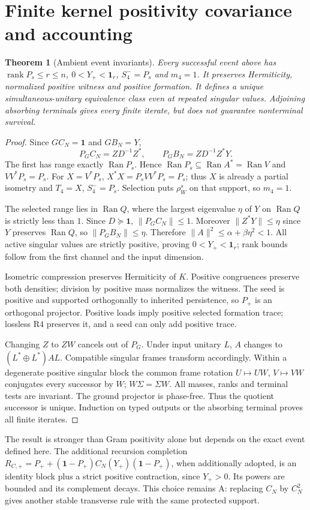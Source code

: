 \documentclass[11pt,letterpaper]{article}
\newcommand{\rank}{\operatorname{rank}}
\newcommand{\Ran}{\operatorname{Ran}}
\newcommand{\Id}{\mathbf 1}
\newtheorem{theorem}{Theorem}[section]
\theoremstyle{definition}
\numberwithin{equation}{section}
\begin{document}
\section{Finite kernel positivity covariance and accounting}
\begin{theorem}[Ambient event invariants]\label{ambient}
Every successful event above has $\rank P_s\leq r\leq n$, $0<Y_+<\Id_r$, $S_4^-=P_s$ and $m_4=1$. It preserves Hermiticity, normalized positive witness and positive formation. It defines a unique simultaneous-unitary equivalence class even at repeated singular values. Adjoining absorbing terminals gives every finite iterate, but does not guarantee nonterminal survival.
\end{theorem}
\begin{proof}
Since $GC_N=\Id$ and $GB_N=Y$,
\begin{equation}
P_GC_N=ZD^{-1}Z^*,\qquad P_GB_N=ZD^{-1}Z^*Y.
\end{equation}
The first has range exactly $\Ran P_s$. Hence $\Ran P_s\subseteq\Ran A^*=\Ran V$ and $VV^*P_s=P_s$. For $X=V^*P_s$, $X^*X=P_sVV^*P_s=P_s$; thus $X$ is already a partial isometry and $T_4=X$, $S_4^-=P_s$. Selection puts $\rho_W^s$ on that support, so $m_4=1$.

The selected range lies in $\Ran Q$, where the largest eigenvalue $\eta$ of $Y$ on $\Ran Q$ is strictly less than $1$. Since $D\succeq\Id$, $\|P_GC_N\|\leq1$. Moreover $\|Z^*Y\|\leq\eta$ since $Y$ preserves $\Ran Q$, so $\|P_GB_N\|\leq\eta$. Therefore $\|A\|^2\leq\alpha+\beta\eta^2<1$. All active singular values are strictly positive, proving $0<Y_+<\Id_r$; rank bounds follow from the first channel and the input dimension.

Isometric compression preserves Hermiticity of $K$. Positive congruences preserve both densities; division by positive mass normalizes the witness. The seed is positive and supported orthogonally to inherited persistence, so $P_+$ is an orthogonal projector. Positive loads imply positive selected formation trace; lossless R4 preserves it, and a seed can only add positive trace.

Changing $Z$ to $ZW$ cancels out of $P_G$. Under input unitary $L$, $A$ changes to $(L^*\oplus L^*)AL$. Compatible singular frames transform accordingly. Within a degenerate positive singular block the common frame rotation $U\mapsto UW$, $V\mapsto VW$ conjugates every successor by $W$; $W\Sigma=\Sigma W$. All masses, ranks and terminal tests are invariant. The ground projector is phase-free. Thus the quotient successor is unique. Induction on typed outputs or the absorbing terminal proves all finite iterates.
\end{proof}
The result is stronger than Gram positivity alone but depends on the exact event defined here. The additional recursion completion $R_{C,+}=P_++(\Id-P_+)C_N(Y_+)(\Id-P_+)$, when additionally adopted, is an identity block plus a strict positive contraction, since $Y_+>0$. Its powers are bounded and its complement decays. This choice remains A: replacing $C_N$ by $C_N^2$ gives another stable transverse rule with the same protected support.
\end{document}
